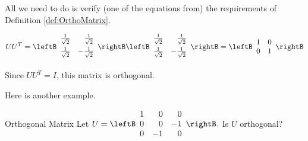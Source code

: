 \begin{solution}
All we need to do is verify (one of the equations from) the requirements of Definition \ref{def:OrthoMatrix}.

\begin{equation*}
UU^{T}=\leftB 
\begin{array}{rr}
\vspace{0.05in}\frac{1}{\sqrt{2}} & \frac{1}{\sqrt{2}} \\ 
\vspace{0.05in}\frac{1}{\sqrt{2}} & -\frac{1}{\sqrt{2}}
\end{array}
\rightB \leftB 
\begin{array}{rr}
\vspace{0.05in}\frac{1}{\sqrt{2}} & \frac{1}{\sqrt{2}} \\ 
\vspace{0.05in}\frac{1}{\sqrt{2}} & -\frac{1}{\sqrt{2}}
\end{array}
\rightB =\allowbreak \leftB 
\begin{array}{cc}
1 & 0 \\ 
0 & 1
\end{array}
\rightB 
\end{equation*}

Since $UU^{T} = I$, this matrix is orthogonal.
\end{solution}

Here is another example.

\begin{example}{Orthogonal Matrix}
Let $U=\leftB
\begin{array}{rrr}
1 & 0 & 0 \\
0 & 0 & -1 \\
0 & -1 & 0
\end{array}
\rightB .$ Is $U$ orthogonal?
\end{example}

